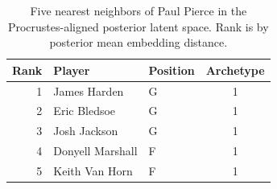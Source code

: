 \begin{table}[htbp]
  \centering\small
  \begin{tabular}{rllc}
    \toprule
    Rank & Player & Position & Archetype \\
    \midrule
    1 & James Harden & G & 1 \\
    2 & Eric Bledsoe & G & 1 \\
    3 & Josh Jackson & G & 1 \\
    4 & Donyell Marshall & F & 1 \\
    5 & Keith Van Horn & F & 1 \\
    \bottomrule
  \end{tabular}
  \caption{Five nearest neighbors of Paul Pierce in the Procrustes-aligned posterior latent space. Rank is by posterior mean embedding distance.}
  \label{tab:Paul_Pierce_neighbors}
\end{table}

